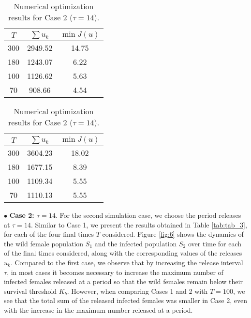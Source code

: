 \documentclass[10pt,letterpaper]{article}
\begin{document}
\begin{table}[h!]
\centering
\begin{minipage}{0.48\textwidth}
\centering
\caption{Numerical optimization results for Case 1 ($\tau = 7$).}
\begin{tabular}{ccc}
\hline
\textbf{$T$} & \textbf{$\sum u_k$} & \textbf{$\min J(u)$} \\ \hline
300                       & 2949.52                                     & 14.75                                           \\ 
180                       & 1243.07                                     & 6.22                                            \\ 
100                       & 1126.62                                     & 5.63                                            \\ 
70                        & 908.66                                      & 4.54                                            \\ \hline
\end{tabular}
\label{tab:tab_2}
\end{minipage}%
\hfill
\begin{minipage}{0.48\textwidth}
\centering
\caption{Numerical optimization results for Case 2 ($\tau = 14$).}
\begin{tabular}{ccc}
\hline
\textbf{$T$} & \textbf{$\sum u_k$} & \textbf{$\min J(u)$} \\ \hline
300                       & 3604.23                                     & 18.02                                           \\ 
180                       & 1677.15                                     & 8.39                                            \\ 
100                       & 1109.34                                     & 5.55                                            \\ 
70                        & 1110.13                                     & 5.55                                            \\ \hline
\end{tabular}
\label{tab:tab_3}
\end{minipage}
\end{table}

$\bullet$ \textbf{Case 2: $\tau = 14$}. For the second simulation case, we choose the period releases at $\tau = 14$. Similar to Case 1, we present the results obtained in Table \eqref{tab:tab_3}, for each of the four final times $T$ considered. Figure \eqref{fig:6} shows the dynamics of the wild female population $S_1$ and the infected population $S_2$ over time for each of the final times considered, along with the corresponding values of the releases $u_k$. Compared to the first case, we observe that by increasing the release interval $\tau$, in most cases it becomes necessary to increase the maximum number of infected females released at a period so that the wild females remain below their survival threshold $K_b$. However, when comparing Cases 1 and 2 with $T=100$, we see that the total sum of the released infected females was smaller in Case 2, even with the increase in the maximum number released at a period.
\end{document}
